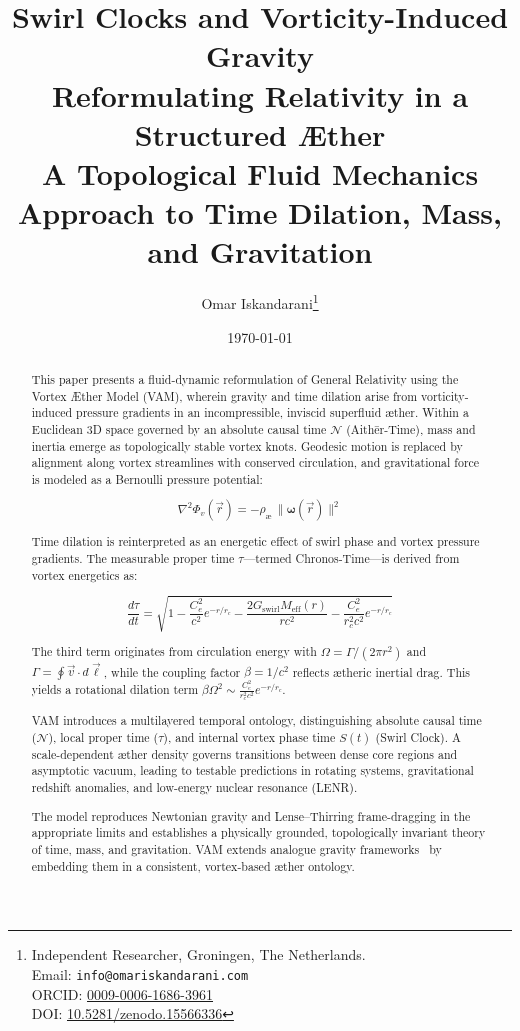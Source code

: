 \documentclass[a4paper,12pt]{article}
\title{Swirl Clocks and Vorticity-Induced Gravity\\[0.5em]
\large Reformulating Relativity in a Structured Æther\\[0.5em]
\normalsize A Topological Fluid Mechanics Approach to Time Dilation, Mass, and Gravitation}
\author{
    Omar Iskandarani\thanks{
        Independent Researcher, Groningen, The Netherlands.\\
        Email: \texttt{info@omariskandarani.com}\\
        ORCID: \href{https://orcid.org/0009-0006-1686-3961}{0009-0006-1686-3961}\\
        DOI: \href{https://doi.org/10.5281/zenodo.15566336}{10.5281/zenodo.15566336}
    }
}
\date{\today}
\begin{document}
    \maketitle
    \vspace{-2ex}

    \begin{abstract}
        This paper presents a fluid-dynamic reformulation of General Relativity using the Vortex Æther Model (VAM), wherein gravity and time dilation arise from vorticity-induced pressure gradients in an incompressible, inviscid superfluid æther. Within a Euclidean 3D space governed by an absolute causal time $\mathcal{N}$ (Aithēr-Time), mass and inertia emerge as topologically stable vortex knots. Geodesic motion is replaced by alignment along vortex streamlines with conserved circulation, and gravitational force is modeled as a Bernoulli pressure potential:

        \[
        \nabla^2 \Phi_v(\vec{r}) = -\rho_\text{\ae} \, \|\boldsymbol{\omega}(\vec{r})\|^2
        \]

        Time dilation is reinterpreted as an energetic effect of swirl phase and vortex pressure gradients. The measurable proper time $\tau$—termed Chronos-Time—is derived from vortex energetics as:

        \[
        \frac{d\tau}{dt} = \sqrt{
        1 - \frac{C_e^2}{c^2} e^{-r/r_c}
        - \frac{2 G_\text{swirl} M_\text{eff}(r)}{r c^2}
        - \frac{C_e^2}{r_c^2 c^2} e^{-r/r_c}
        }
        \]

        The third term originates from circulation energy with $\Omega = \Gamma / (2\pi r^2)$ and $\Gamma = \oint \vec{v} \cdot d\vec{\ell}$, while the coupling factor $\beta = 1/c^2$ reflects ætheric inertial drag. This yields a rotational dilation term $\beta \Omega^2 \sim \frac{C_e^2}{r_c^2 c^2} e^{-r/r_c}$.

        VAM introduces a multilayered temporal ontology, distinguishing absolute causal time ($\mathcal{N}$), local proper time ($\tau$), and internal vortex phase time $S(t)$ (Swirl Clock). A scale-dependent æther density governs transitions between dense core regions and asymptotic vacuum, leading to testable predictions in rotating systems, gravitational redshift anomalies, and low-energy nuclear resonance (LENR).

        The model reproduces Newtonian gravity and Lense–Thirring frame-dragging in the appropriate limits and establishes a physically grounded, topologically invariant theory of time, mass, and gravitation. VAM extends analogue gravity frameworks~\cite{barcelo2011analogue,volovik2009universe} by embedding them in a consistent, vortex-based æther ontology.
    \end{abstract}
\end{document}
